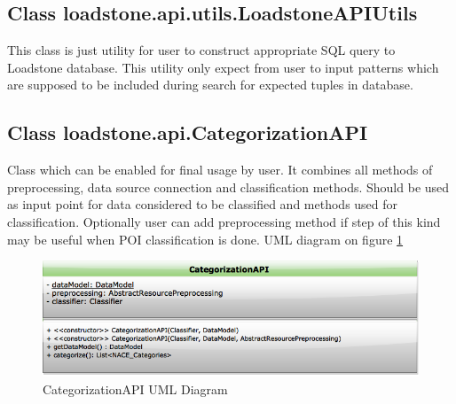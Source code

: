 \subsection{Class loadstone.api.utils.LoadstoneAPIUtils}
This class is just utility for user to construct appropriate SQL query to Loadstone database. This utility only expect from user to input patterns which are supposed to be included during search for expected tuples in database. 

\subsection{Class loadstone.api.CategorizationAPI}
Class which can be enabled for final usage by user. It combines all methods of preprocessing, data source connection and classification methods. Should be used as input point for data considered to be classified and methods used for classification. Optionally user can add preprocessing method if step of this kind may be useful when POI classification is done. UML diagram on figure \ref{fig:@=CategorizationAPI}

\begin{figure}[h]
	\centering
	\includegraphics[scale=0.5]{CategorizationAPI.png}
	\caption{CategorizationAPI UML Diagram}
	\label{fig:@=CategorizationAPI}
\end{figure}

